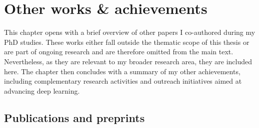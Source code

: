 \chapter{Other works \& achievements}\label{chapter:other}

This chapter opens with a brief overview of other papers I co-authored during my PhD studies. These works either fall outside the thematic scope of this thesis or are part of ongoing research and are therefore omitted from the main text. Nevertheless, as they are relevant to my broader research area, they are included here. The chapter then concludes with a summary of my other achievements, including complementary research activities and outreach initiatives aimed at advancing deep learning.

\section{Publications and preprints}

